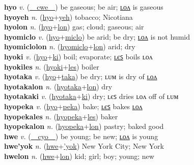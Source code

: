 \textbf{hyo} \textit{v.} (\hyperref[cwe]{~~cwe~~})
be gaseous; be air; \hyperref[hyolon]{ʟᴏᴧ} is gaseous \label{hyo} \\
\textbf{hyoyeh} \textit{n.} (\hyperref[hyo]{hyo}+\hyperref[yeh]{yeh})
tobacco; Nicotiana \label{hyoyeh} \\
\textbf{hyolon} \textit{n.} (\hyperref[hyo]{hyo}+\hyperref[lon]{lon})
gas; cloud; gaseous; air \label{hyolon} \\
\textbf{hyomiclo} \textit{v.} (\hyperref[hyo]{hyo}+\hyperref[miclo]{miclo})
be arid; be dry; \hyperref[hyomiclolon]{ʟᴏᴧ} is not humid \label{hyomiclo} \\
\textbf{hyomiclolon} \textit{n.} (\hyperref[hyomiclo]{hyomiclo}+\hyperref[lon]{lon})
arid; dry \label{hyomiclolon} \\
\textbf{hyoki} \textit{v.} (\hyperref[hyo]{hyo}+\hyperref[ki]{ki})
boil; evaporate; \hyperref[hyokiles]{ʟєꜱ} boils ʟᴏᴧ \label{hyoki} \\
\textbf{hyokiles} \textit{n.} (\hyperref[hyoki]{hyoki}+\hyperref[les]{les})
boiler \label{hyokiles} \\
\textbf{hyotaka} \textit{v.} (\hyperref[hyo]{hyo}+\hyperref[taka]{taka})
be dry; ʟᴜᴍ is dry of \hyperref[hyotakalon]{ʟᴏᴧ} \label{hyotaka} \\
\textbf{hyotakalon} \textit{n.} (\hyperref[hyotaka]{hyotaka}+\hyperref[lon]{lon})
dry \label{hyotakalon} \\
\textbf{hyotakaki} \textit{v.} (\hyperref[hyotaka]{hyotaka}+\hyperref[ki]{ki})
dry; ʟєꜱ dries ʟᴏᴧ off of ʟᴜᴍ \label{hyotakaki} \\
\textbf{hyopeka} \textit{v.} (\hyperref[hyo]{hyo}+\hyperref[peka]{peka})
bake; \hyperref[hyopekales]{ʟєꜱ} bakes \hyperref[hyopekalon]{ʟᴏᴧ} \label{hyopeka} \\
\textbf{hyopekales} \textit{n.} (\hyperref[hyopeka]{hyopeka}+\hyperref[les]{les})
baker \label{hyopekales} \\
\textbf{hyopekalon} \textit{n.} (\hyperref[hyopeka]{hyopeka}+\hyperref[lon]{lon})
pastry; baked good \label{hyopekalon} \\
\textbf{hwe} \textit{v.} (\hyperref[cyo]{~~cyo~~})
be young; be new; \hyperref[hwelon]{ʟᴏᴧ} is young \label{hwe} \\
\textbf{hwe'yok} \textit{n.} (\hyperref[hwe]{hwe}+\hyperref['yok]{'yok})
New York City; New York \label{hwe'yok} \\
\textbf{hwelon} \textit{n.} (\hyperref[hwe]{hwe}+\hyperref[lon]{lon})
kid; girl; boy; young; new \label{hwelon} \\
